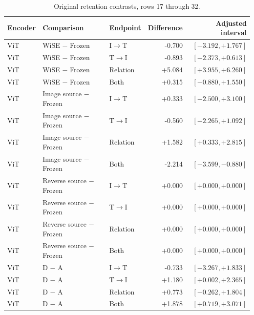 \begin{table}[t]
\centering
\small
\setlength{\tabcolsep}{3pt}
\begin{tabular}{lllrr}
\toprule
Encoder & Comparison & Endpoint & Difference & Adjusted interval\\
\midrule
ViT & WiSE $-$ Frozen & I$\to$T & -0.700 & $[-3.192,+1.767]$ \\
ViT & WiSE $-$ Frozen & T$\to$I & -0.893 & $[-2.373,+0.613]$ \\
ViT & WiSE $-$ Frozen & Relation & +5.084 & $[+3.955,+6.260]$ \\
ViT & WiSE $-$ Frozen & Both & +0.315 & $[-0.880,+1.550]$ \\
ViT & Image source $-$ Frozen & I$\to$T & +0.333 & $[-2.500,+3.100]$ \\
ViT & Image source $-$ Frozen & T$\to$I & -0.560 & $[-2.265,+1.092]$ \\
ViT & Image source $-$ Frozen & Relation & +1.582 & $[+0.333,+2.815]$ \\
ViT & Image source $-$ Frozen & Both & -2.214 & $[-3.599,-0.880]$ \\
ViT & Reverse source $-$ Frozen & I$\to$T & +0.000 & $[+0.000,+0.000]$ \\
ViT & Reverse source $-$ Frozen & T$\to$I & +0.000 & $[+0.000,+0.000]$ \\
ViT & Reverse source $-$ Frozen & Relation & +0.000 & $[+0.000,+0.000]$ \\
ViT & Reverse source $-$ Frozen & Both & +0.000 & $[+0.000,+0.000]$ \\
ViT & D $-$ A & I$\to$T & -0.733 & $[-3.267,+1.833]$ \\
ViT & D $-$ A & T$\to$I & +1.180 & $[+0.002,+2.365]$ \\
ViT & D $-$ A & Relation & +0.773 & $[-0.262,+1.804]$ \\
ViT & D $-$ A & Both & +1.878 & $[+0.719,+3.071]$ \\
\bottomrule
\end{tabular}
\caption{Original retention contrasts, rows 17 through 32.}\label{tab:originalretention16}
\end{table}


